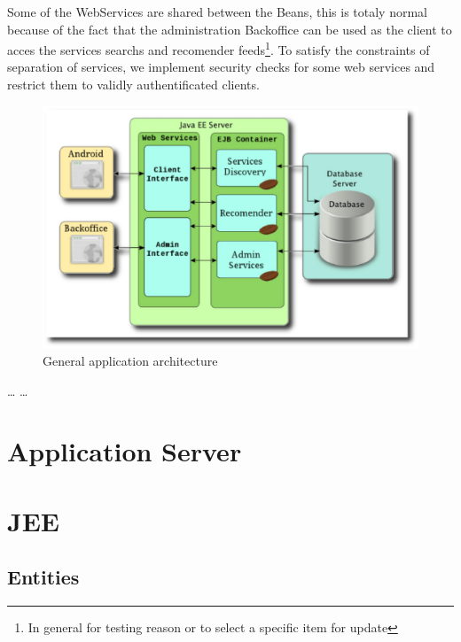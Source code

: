Some of the WebServices are shared between the Beans, this is totaly normal
because of the fact that the administration Backoffice can be used as the client
to acces the services searchs and recomender feeds\footnote{In general for
testing reason or to select a specific item for update}. To satisfy the
constraints of separation of services, we implement security checks for some web
services and restrict them to validly authentificated
clients.

\begin{figure}[!htb]
  \begin{center}
  \includegraphics[scale=0.6]{Figures/Architecture_of_HyperPath_Application.eps}
  \end{center}
  \caption{General application architecture}
  \label{General application architecture}
\end{figure}

\ldots{}
\ldots{}

\section{Application Server}

\section{JEE}
\subsection{Entities}
